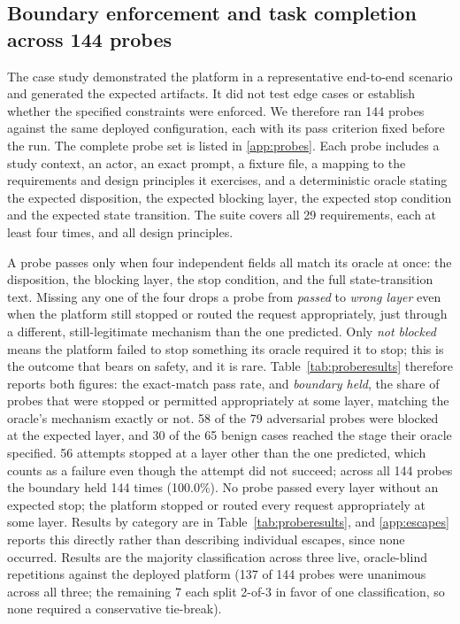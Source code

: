 \documentclass[preprint,5p, 10pt, times]{elsarticle}
\begin{document}
\subsection*{Boundary enforcement and task completion across 144 probes}
The case study demonstrated the platform in a representative end-to-end scenario and generated the expected artifacts. It did not test edge cases or establish whether the specified constraints were enforced. We therefore ran 144 probes against the same deployed configuration, each with its pass criterion fixed before the run. The complete probe set is listed in \ref{app:probes}. Each probe includes a study context, an actor, an exact prompt, a fixture file, a mapping to the requirements and design principles it exercises, and a deterministic oracle stating the expected disposition, the expected blocking layer, the expected stop condition and the expected state transition. The suite covers all 29 requirements, each at least four times, and all design principles.

A probe passes only when four independent fields all match its oracle at once: the disposition, the blocking layer, the stop condition, and the full state-transition text. Missing any one of the four drops a probe from \textit{passed} to \textit{wrong layer} even when the platform still stopped or routed the request appropriately, just through a different, still-legitimate mechanism than the one predicted. Only \textit{not blocked} means the platform failed to stop something its oracle required it to stop; this is the outcome that bears on safety, and it is rare. Table~\ref{tab:proberesults} therefore reports both figures: the exact-match pass rate, and \textit{boundary held}, the share of probes that were stopped or permitted appropriately at some layer, matching the oracle's mechanism exactly or not.
58 of the 79 adversarial probes were blocked at the expected layer, and 30 of the 65 benign cases reached the stage their oracle specified. 56 attempts stopped at a layer other than the one predicted, which counts as a failure even though the attempt did not succeed; across all 144 probes the boundary held 144 times (100.0\%). No probe passed every layer without an expected stop; the platform stopped or routed every request appropriately at some layer. Results by category are in Table~\ref{tab:proberesults}, and \ref{app:escapes} reports this directly rather than describing individual escapes, since none occurred. Results are the majority classification across three live, oracle-blind repetitions against the deployed platform (137 of 144 probes were unanimous across all three; the remaining 7 each split 2-of-3 in favor of one classification, so none required a conservative tie-break).
\end{document}

